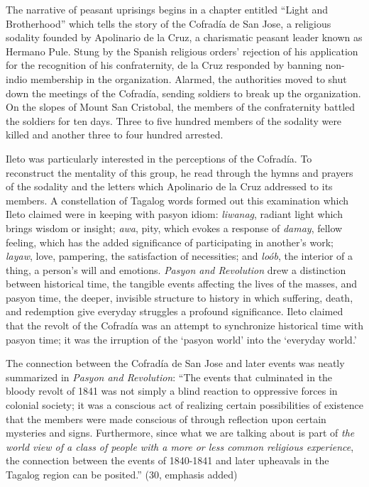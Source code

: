 The narrative of peasant uprisings begins in a chapter entitled \enquote{Light and Brotherhood} which tells the story of the Cofrad\'ia de San Jose, a religious sodality founded by Apolinario de la Cruz, a charismatic peasant leader known as Hermano Pule. Stung by the Spanish religious orders’ rejection of his application for the recognition of his confraternity, de la Cruz responded by banning non-indio membership in the organization. Alarmed, the authorities moved to shut down the meetings of the Cofrad\'ia, sending soldiers to break up the organization. On the slopes of Mount San Cristobal, the members of the confraternity battled the soldiers for ten days. Three to five hundred members of the sodality were killed and another three to four hundred arrested.

Ileto was particularly interested in the perceptions of the Cofrad\'ia. To reconstruct the mentality of this group, he read through the hymns and prayers of the sodality and the letters which Apolinario de la Cruz addressed to its members. A constellation of Tagalog words formed out this examination which Ileto claimed were in keeping with pasyon idiom: \textit{liwanag}, radiant light which brings wisdom or insight; \textit{awa}, pity, which evokes a response of \textit{damay}, fellow feeling, which has the added significance of participating in another's work; \textit{layaw}, love, pampering, the satisfaction of necessities; and \textit{lo\'ob}, the interior of a thing, a person's will and emotions. \textit{Pasyon and Revolution} drew a distinction between historical time, the tangible events affecting the lives of the masses, and pasyon time, the deeper, invisible structure to history in which suffering, death, and redemption give everyday struggles a profound significance. Ileto claimed that the revolt of the Cofrad\'ia was an attempt to synchronize historical time with pasyon time; it was the irruption of the \enquote*{pasyon world} into the \enquote*{everyday world.}

The connection between the Cofrad\'ia de San Jose and later events was neatly summarized in \textit{Pasyon and Revolution}: \enquote{The events that culminated in the bloody revolt of 1841 was  not simply a blind reaction to oppressive forces in colonial society; it was a conscious act of realizing certain possibilities of existence that the members were made conscious of through reflection upon certain mysteries and signs. Furthermore, since what we are talking about is part of \textit{the world view of a class of people with a more or less common religious experience}, the connection between the events of 1840-1841 and later upheavals in the Tagalog region can be posited.} (30, emphasis added)

